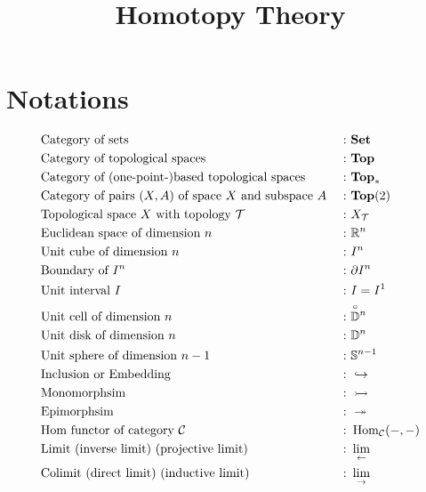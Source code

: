 

% 

\newcommand{\Cof}{\mathrm{Cof}}
\newcommand{\Fib}{\mathrm{Fib}}

\newcommand{\phead}{\hspace*{0.46cm}}
\DeclareMathOperator{\Homtop}{\rm{Hom}_{\mbf{Top}}}


    \title{Homotopy Theory}
    \author{{\color{pink}{Cloudi}}{\color{Aquamarine}{fold}}}
    \maketitle
    \newpage

    \section{Notations}

    \begin{align*}
        & \text{Category of sets } &: \ & \mbf{Set} \\
        & \text{Category of topological spaces }&: \ & \mbf{Top} \\
        & \text{Category of (one-point-)based topological spaces }&: \  & \mbf{Top}_* \\
        & \text{Category of pairs $(X,A)$ of space $X$ and subspace $A$ } &: \ & \mbf{Top}(2) \\
        & \text{Topological space $X$ with topology $\mcT$ } &: \ & X_{\mcT}\\
        & \text{Euclidean space of dimension $n$ } &: \ & \bbRn\\
        & \text{Unit cube of dimension $n$ } &: \ & I^n\\
        & \text{Boundary of $I^n$ }          &: \ & \partial I^n\\
        & \text{Unit interval $I$}           &: \ & I = I^1\\
        & \text{Unit cell of dimension $n$ } &: \ & \unitcell{n} \\
        & \text{Unit disk of dimension $n$ } &: \ & \bbD^n\\
        & \text{Unit sphere of dimension $n-1$ } &: \ & \bbS^{n-1}\\
        & \text{Inclusion or Embedding } &: \ & \hookrightarrow \\
        & \text{Monomorphsim }      &: \ & \rightarrowtail \\
        & \text{Epimorphsim }       &: \ & \twoheadrightarrow \\
        & \text{Hom functor of category $\mcC $} &: \ & \Hom_{\mcC}(-,-)\\
        & \text{Limit (inverse limit) (projective limit) } &: \ & \lim_{\leftarrow} \\
        & \text{Colimit (direct limit) (inductive limit) } &: \ & \lim_{\rightarrow} \\
    \end{align*}


